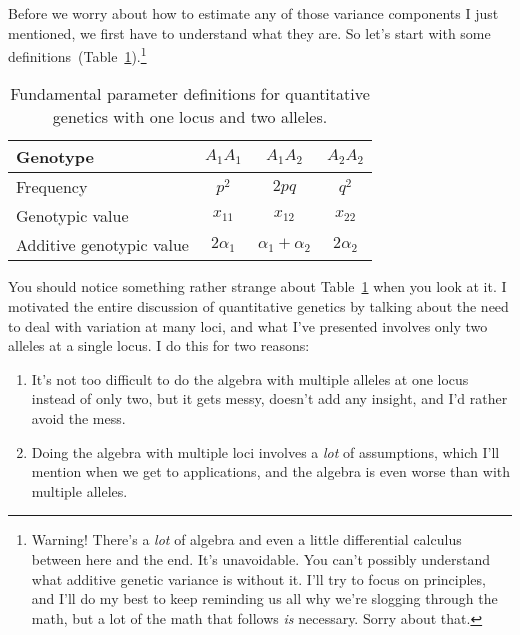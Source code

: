 \documentclass[12pt]{article}
\begin{document}
Before we worry about how to estimate any of those variance components
I just mentioned, we first have to understand what they are. So let's
start with some
definitions~(Table~\ref{table:definitions}).\footnote{Warning! There's
  a {\it lot\/} of algebra and even a little differential calculus
  between here and the end. It's unavoidable. You can't possibly
  understand what additive genetic variance is without it. I'll try to
  focus on principles, and I'll do my best to keep reminding us all
  why we're slogging through the math, but a lot of the math that
  follows {\it is\/} necessary. Sorry about that.}

\begin{table}
\begin{center}
\begin{tabular}{l|ccc}
\hline\hline
Genotype                 & $A_1A_1$    & $A_1A_2$ & $A_2A_2$ \\
\hline
Frequency                & $p^2$       & $2pq$    & $q^2$ \\
Genotypic value          & $x_{11}$    & $x_{12}$ & $x_{22}$ \\
Additive genotypic value & $2\alpha_1$ & $\alpha_1 + \alpha_2$
                                                  & $2\alpha_2$ \\
\hline
\end{tabular}
\end{center}
\caption{Fundamental parameter definitions for quantitative genetics
  with one locus and two alleles.}\label{table:definitions}
\end{table}

You should notice something rather strange about
Table~\ref{table:definitions} when you look at it. I motivated the
entire discussion of quantitative genetics by talking about the need
to deal with variation at many loci, and what I've presented involves
only two alleles at a single locus. I do this for two reasons:

\begin{enumerate}

\item It's not too difficult to do the algebra with multiple alleles
  at one locus instead of only two, but it gets messy, doesn't add any
  insight, and I'd rather avoid the mess.

\item Doing the algebra with multiple loci involves a {\it lot\/} of
  assumptions, which I'll mention when we get to applications, and the
  algebra is even worse than with multiple alleles.

\end{enumerate}
\end{document}
